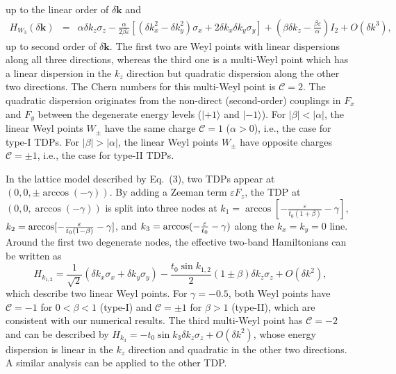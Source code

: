 \documentclass[aps,prl,floatfix,twocolumn,reprint]{revtex4}
\begin{document}
up to the linear order of $\delta \bm{k}$ and
\begin{eqnarray}
H_{W_{3}}(\delta \bm{k}) &=&\alpha \delta k_{z}\sigma _{z}-\frac{\alpha}{2\beta\varepsilon}[(\delta k_x^2-\delta k_y^2)\sigma_x+2\delta k_x\delta k_y\sigma_y] +(\beta \delta
k_{z}-\frac{\beta \varepsilon }{\alpha })I_{2}+ O(\delta k^3),
\end{eqnarray}
 up to second order of $\delta \bm{k}$. The first two are Weyl points
with linear dispersions along all three directions, whereas the third one is
a multi-Weyl point which has a linear dispersion in the $k_{z}$ direction
but quadratic dispersion along the other two directions. The Chern numbers
for this multi-Weyl point is $\mathcal{C}=2$. The quadratic dispersion
originates from the non-direct (second-order) couplings in $F_{x}$ and $F_{y}$
between the degenerate energy levels ($|+1\rangle $ and $|-1\rangle $). 
For $|\beta |<|\alpha |$, the
linear Weyl points $W_{\pm }$ have the same charge $\mathcal{C}=1$ ($\alpha
>0$), i.e., the case for type-I TDPs. For $|\beta |>|\alpha |$, the linear
Weyl points $W_{\pm }$ have opposite charges $\mathcal{C}=\pm 1$, i.e., the
case for type-II TDPs.

In the lattice model described by Eq.~(3), two TDPs appear at $(0,0,\pm \arccos
(-\gamma ))$. By adding a Zeeman term $\varepsilon F_{z}$, the TDP at $%
(0,0,\arccos (-\gamma ))$ is split into three nodes at $k_{1}=\arccos [-%
\frac{\varepsilon }{t_{0}(1+\beta )}-\gamma ]$, $k_{2}=\arccos [-\frac{%
\varepsilon }{t_{0}(1-\beta )}-\gamma ]$, and $k_{3}=\arccos (-\frac{%
\varepsilon }{t_{0}}-\gamma )$ along the $k_{x}=k_{y}=0$ line. Around the
first two degenerate nodes, the effective two-band Hamiltonians can be
written as
\begin{equation}
H_{k_{1,2}}=\frac{1}{\sqrt{2}}(\delta k_{x}\sigma _{x}+\delta k_{y}\sigma
_{y})-\frac{t_{0}\sin k_{1,2}}{2}(1\pm \beta )\delta k_{z}\sigma
_{z}+O(\delta k^{2}),  \label{weylham}
\end{equation}%
which describe two linear Weyl points. For $\gamma =-0.5$, both Weyl points
have $\mathcal{C}=-1$ for $0<\beta <1$ (type-I) and $\mathcal{C}=\pm 1$ for $%
\beta >1$ (type-II), which are consistent with our numerical results. The
third multi-Weyl point has $\mathcal{C}=-2$ and can be described by $%
H_{k_{3}}=-t_{0}\sin k_{3}\delta k_{z}\sigma _{z}+O(\delta k^{2})$, whose
energy dispersion is linear in the $k_{z}$ direction and quadratic in the
other two directions. A similar analysis can be applied to the other TDP.
\end{document}
